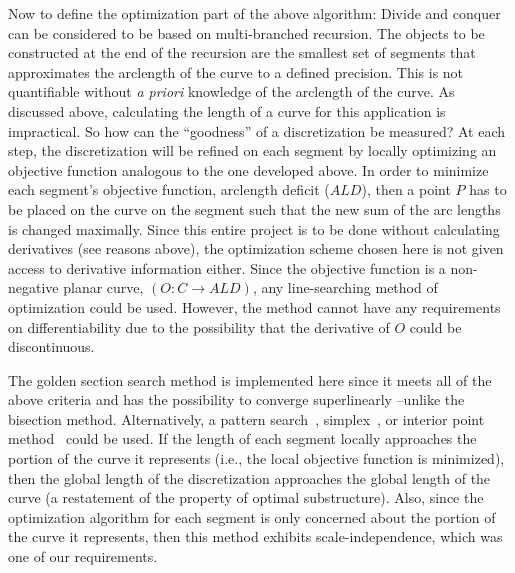 Now to define the optimization part of the above algorithm: Divide and 
conquer can be considered to be based on multi-branched recursion. The 
objects to be constructed at the end of the recursion are the smallest set 
of segments that approximates the arclength of the curve to a defined 
precision. This is not quantifiable without {\it{a priori}} knowledge 
of the arclength of the curve. As discussed above, calculating the length 
of a curve for this application is impractical. So how can the 
``goodness'' of a discretization be measured?  At each step, the 
discretization will be refined on each segment by locally optimizing an 
objective function analogous to the one developed above. In order to 
minimize each segment's objective function, arclength deficit ($ALD$), 
then a point $P$ has to be placed on the curve on the segment such 
that the new sum of the arc lengths is changed maximally. Since this 
entire project is to be done without calculating derivatives (see reasons 
above), the optimization scheme chosen here is not given access to 
derivative information either. Since the objective function is a 
non-negative planar curve, $(O: C \rightarrow ALD)$, any line-searching 
method of optimization could be used. However, the method cannot have any 
requirements on differentiability due to the possibility that the 
derivative of $O$ could be discontinuous.

The golden section search method is implemented here since it meets all of 
the above criteria and has the possibility to converge superlinearly 
\cite{brent73}--unlike the bisection method.  Alternatively, a pattern 
search~\cite{hopspack}, simplex~\cite{dantzig1,dantzig2}, or interior 
point method~\cite{karmarkar} could be used.  If the length of each 
segment 
locally approaches the portion of the curve it represents (i.e., the 
local objective function is 
minimized), then the global length of the discretization approaches the 
global length of the curve (a restatement of the property of optimal 
substructure). Also, since the optimization algorithm for each segment is 
only concerned about the portion of the curve it represents, then this 
method exhibits scale-independence, which was one of our requirements.

